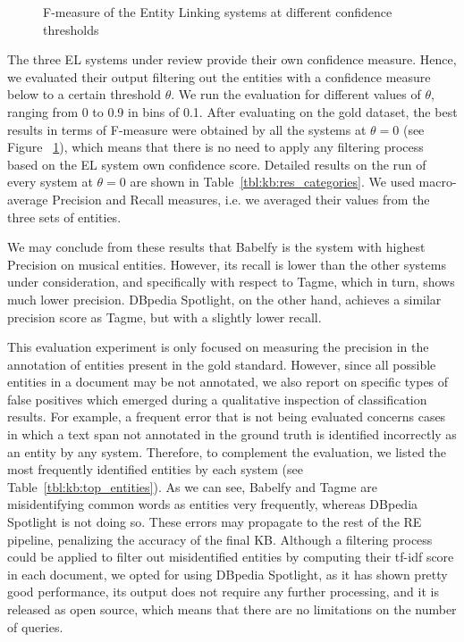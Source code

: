 \begin{figure}[!htp]
\centerline{}
\caption{F-measure of the Entity Linking systems at different confidence thresholds}
\label{fig:kb:confidence_el}
\end{figure}

The three \textsc{EL} systems under review provide their own confidence measure. Hence, we evaluated their output filtering out the entities with a confidence measure below to a certain threshold $\theta$. We run the evaluation for different values of $\theta$, ranging from 0 to 0.9 in bins of 0.1. After evaluating on the gold dataset, the best results in terms of F-measure were obtained by all the systems at $\theta = 0$ (see Figure ~\ref{fig:kb:confidence_el}), which means that there is no need to apply any filtering process based on the \textsc{EL} system own confidence score. Detailed results on the run of every system at $\theta = 0$ are shown in Table~\ref{tbl:kb:res_categories}. We used macro-average Precision and Recall measures, i.e. we averaged their values from the three sets of entities.

We may conclude from these results that Babelfy is the system with highest Precision on musical entities. However, its recall is lower than the other systems under consideration, and specifically with respect to Tagme, which in turn, shows much lower precision. DBpedia Spotlight, on the other hand, achieves a similar precision score as Tagme, but with a slightly lower recall. 

This evaluation experiment is only focused on measuring the precision in the annotation of entities present in the gold standard. However, since all possible entities in a document may be not annotated, we also report on specific types of false positives which emerged during a qualitative inspection of classification results. For example, a frequent error that is not being evaluated concerns cases in which a text span not annotated in the ground truth is identified incorrectly as an entity by any system. Therefore, to complement the evaluation, we listed the most frequently identified entities by each system (see Table~\ref{tbl:kb:top_entities}). As we can see, Babelfy and Tagme are misidentifying common words as entities very frequently, whereas DBpedia Spotlight is not doing so. 
These errors may propagate to the rest of the \textsc{RE} pipeline, penalizing the accuracy of the final KB.
Although a filtering process could be applied to filter out misidentified entities by computing their tf-idf score in each document, we opted for using DBpedia Spotlight, as it has shown pretty good performance, its output does not require any further processing, and it is released as open source, which means that there are no limitations on the number of queries.

